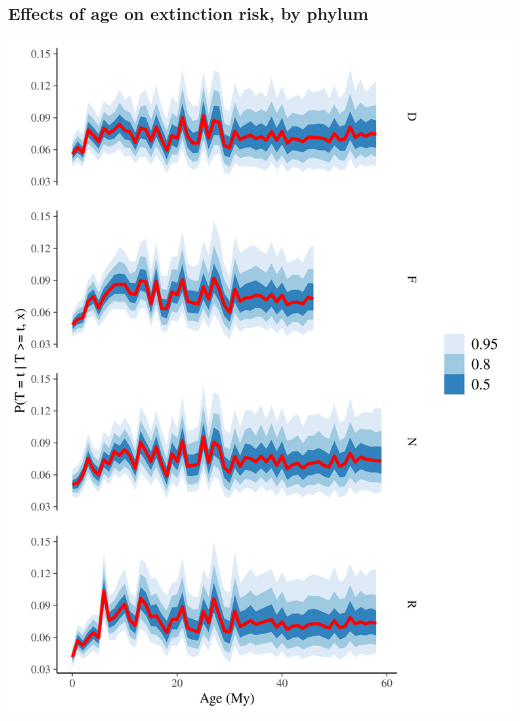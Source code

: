 \documentclass{beamer}
\begin{document}
\begin{frame}
  \frametitle{Effects of age on extinction risk, by phylum}

  \includegraphics[width=\textwidth,height=0.8\textheight,keepaspectratio=true]{../results/figure/hazard_bygroup}

\end{frame}
\end{document}
